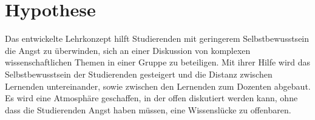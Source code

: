 \section{Hypothese}
Das entwickelte Lehrkonzept hilft Studierenden mit geringerem Selbstbewusstsein die Angst zu
überwinden, sich an einer Diskussion von komplexen wissenschaftlichen Themen in einer Gruppe zu
beteiligen. Mit ihrer Hilfe wird das Selbstbewusstsein der Studierenden gesteigert und die Distanz zwischen Lernenden untereinander, sowie zwischen den Lernenden zum Dozenten abgebaut. Es wird eine Atmosphäre geschaffen, in der offen diskutiert werden kann, ohne dass die Studierenden Angst haben müssen, eine Wissenslücke zu offenbaren.